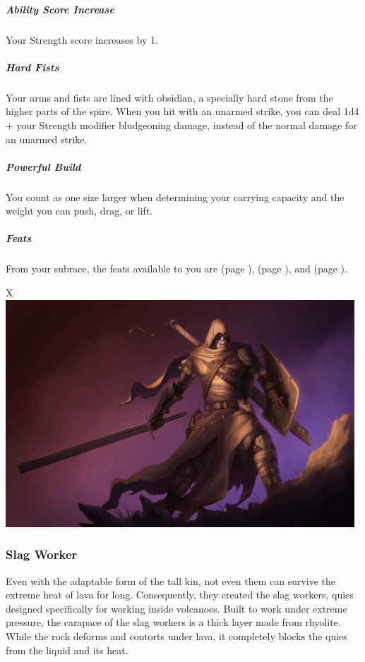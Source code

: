     \subparagraph{Ability Score Increase} Your Strength score increases by 1.

    \subparagraph{Hard Fists} Your arms and fists are lined with obsidian, a specially hard stone from the higher parts of the spire.
    When you hit with an unarmed strike, you can deal 1d4 + your Strength modifier bludgeoning damage, instead of the normal damage for an unarmed strike.

    \subparagraph{Powerful Build} You count as one size larger when determining your carrying capacity and the weight you can push, drag, or lift.

    \subparagraph{Feats} From your subrace, the feats available to you are
    \textbf{} (page \pageref{feat::}),
    \textbf{} (page \pageref{feat::}), and
    \textbf{} (page \pageref{feat::}).

\begin{table}[b]%
    \begin{DndTable}[width=\linewidth]{X}
        \includegraphics[width=0.98\textwidth]{04kins/img/21quies_executioner.jpg}
    \end{DndTable}
\end{table}

\subsubsection{Slag Worker}
    Even with the adaptable form of the tall kin, not even them can survive the extreme heat of lava for long.
    Consequently, they created the slag workers, quies designed specifically for working inside volcanoes.
    Built to work under extreme pressure, the carapace of the slag workers is a thick layer made from rhyolite.
    While the rock deforms and contorts under lava, it completely blocks the quies from the liquid and its heat.

